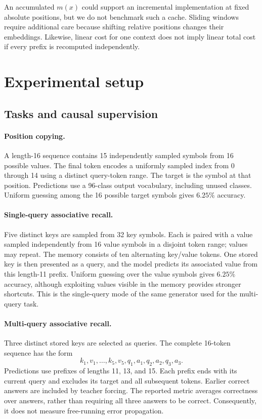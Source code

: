 \documentclass[11pt]{article}
\begin{document}
An accumulated $m(x)$ could support an incremental implementation at fixed absolute positions, but we do not benchmark such a cache. Sliding windows require additional care because shifting relative positions changes their embeddings. Likewise, linear cost for one context does not imply linear total cost if every prefix is recomputed independently.

\section{Experimental setup}
\subsection{Tasks and causal supervision}
\paragraph{Position copying.}
A length-16 sequence contains 15 independently sampled symbols from 16 possible values. The final token encodes a uniformly sampled index from 0 through 14 using a distinct query-token range. The target is the symbol at that position. Predictions use a 96-class output vocabulary, including unused classes. Uniform guessing among the 16 possible target symbols gives $6.25\%$ accuracy.

\paragraph{Single-query associative recall.}
Five distinct keys are sampled from 32 key symbols. Each is paired with a value sampled independently from 16 value symbols in a disjoint token range; values may repeat. The memory consists of ten alternating key/value tokens. One stored key is then presented as a query, and the model predicts its associated value from this length-11 prefix. Uniform guessing over the value symbols gives $6.25\%$ accuracy, although exploiting values visible in the memory provides stronger shortcuts. This is the single-query mode of the same generator used for the multi-query task.

\paragraph{Multi-query associative recall.}
Three distinct stored keys are selected as queries. The complete 16-token sequence has the form
\begin{equation*}
 k_1,v_1,\ldots,k_5,v_5,q_1,a_1,q_2,a_2,q_3,a_3.
\end{equation*}
Predictions use prefixes of lengths 11, 13, and 15. Each prefix ends with its current query and excludes its target and all subsequent tokens. Earlier correct answers are included by teacher forcing. The reported metric averages correctness over answers, rather than requiring all three answers to be correct. Consequently, it does not measure free-running error propagation.
\end{document}
